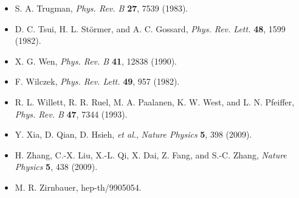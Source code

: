 \begin{itemize}[leftmargin=2em,itemsep=0pt,parsep=0pt,label={}]
\item [T1983] S. A. Trugman, \emph{Phys. Rev. B} \textbf{27}, 7539 (1983).
\item [TSG1982] D. C. Tsui, H. L. Störmer, and A. C. Gossard, \emph{Phys. Rev. Lett.} \textbf{48}, 1599 (1982).
\item [W1990] X. G. Wen, \emph{Phys. Rev. B} \textbf{41}, 12838 (1990).
\item [W1982] F. Wilczek, \emph{Phys. Rev. Lett.} \textbf{49}, 957 (1982).
\item [W1993] R. L. Willett, R. R. Ruel, M. A. Paalanen, K. W. West, and L. N. Pfeiffer, \emph{Phys. Rev. B} \textbf{47}, 7344 (1993).
\item [X2009] Y. Xia, D. Qian, D. Hsieh, \emph{et al.}, \emph{Nature Physics} \textbf{5}, 398 (2009).
\item [Z2009] H. Zhang, C.-X. Liu, X.-L. Qi, X. Dai, Z. Fang, and S.-C. Zhang, \emph{Nature Physics} \textbf{5}, 438 (2009).
\item [Z1999] M. R. Zirnbauer, hep-th/9905054.
\end{itemize}
